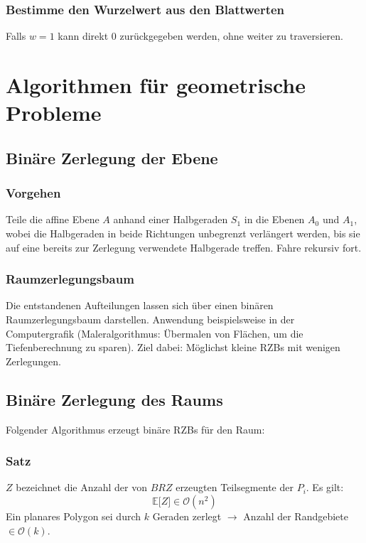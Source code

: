 \subsubsection{Bestimme den Wurzelwert aus den Blattwerten}


Falls \(w=1\) kann direkt \(0\) zurückgegeben werden, ohne weiter zu traversieren.



\section{Algorithmen für geometrische Probleme}

\subsection{Binäre Zerlegung der Ebene}

\subsubsection{Vorgehen}
Teile die affine Ebene \(A\) anhand einer Halbgeraden \(S_1\) in die Ebenen \(A_0\) und \(A_1\), wobei die Halbgeraden in beide Richtungen unbegrenzt verlängert werden, bis sie auf eine bereits zur Zerlegung verwendete Halbgerade treffen. Fahre rekursiv fort.

\subsubsection{Raumzerlegungsbaum}
Die entstandenen Aufteilungen lassen sich über einen binären Raumzerlegungsbaum darstellen. Anwendung beispielsweise in der Computergrafik (Maleralgorithmus: Übermalen von Flächen, um die Tiefenberechnung zu sparen).
Ziel dabei: Möglichst kleine RZBs mit wenigen Zerlegungen.


\subsection{Binäre Zerlegung des Raums}
Folgender Algorithmus erzeugt binäre RZBs für den Raum:
\text{}\\


\subsubsection{Satz}
\(Z\) bezeichnet die Anzahl der von \(BRZ\) erzeugten Teilsegmente der \(P_i\). Es gilt:
\[\mathbb{E}\lbrack Z \rbrack \in \mathcal{O}(n^2)\]
Ein planares Polygon sei durch \(k\) Geraden zerlegt \(\rightarrow\) Anzahl der Randgebiete \(\in \mathcal{O}(k)\).


